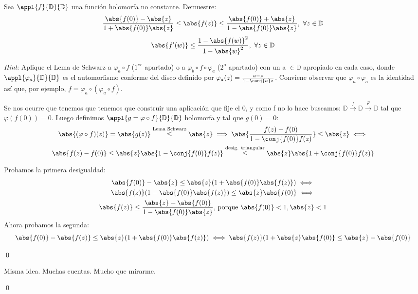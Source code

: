 \begin{problem}[5]
Sea $\appl{f}{\mathbb{D}}{\mathbb{D}}$ una función holomorfa no constante. Demuestre:
\ppart
\[\frac{\abs{f(0)} - \abs{z}}{1 + \abs{f(0)}\abs{z}} \leq \abs{f(z)} \leq \frac{\abs{f(0)} + \abs{z}}{1 - \abs{f(0)}\abs{z}}, \ \forall z \in \mathbb{D}\]
\ppart
\[\abs{f'(w)} \leq \frac{1 - \abs{f(w)}^2}{1 - \abs{w}^2}, \ \forall z \in \mathbb{D}\]

{\it Hint}: Aplique el Lema de Schwarz a $\varphi_a \circ f$ ($1^{er}$ apartado) o a $\varphi_b \circ f \circ \varphi_a$ ($2^o$ apartado) con un a $\in \mathbb{D}$ apropiado en cada caso, donde $\appl{\varphi_a}{\mathbb{D}}{\mathbb{D}}$ es el automorfismo conforme del disco definido por $\varphi_a(z) = \frac{a - z}{1 - \conj{a} z}$. Conviene observar que $\varphi_a \circ \varphi_a$ es la identidad así que, por ejemplo, $f = \varphi_a \circ (\varphi_a \circ f)$.
\solution

\spart
Se nos ocurre que tenemos que tenemos que construir una aplicación que fije el 0, y como f no lo hace buscamos: $\mathbb{D}\xrightarrow{f}\mathbb{D}\xrightarrow{\varphi}\mathbb{D}$ tal que $\varphi(f(0)) = 0$.
Luego definimos $\appl{g = \varphi \circ f}{\mathbb{D}}{\mathbb{D}}$ holomorfa y tal que $g(0) = 0$:
\begin{gather*}
\abs{(\varphi \circ f)(z)} = \abs{g(z)} \stackrel{\text{Lema Schwarz}}{\leq} \abs{z} \implies \abs{\frac{f(z) - f(0)}{1 - \conj{f(0)} f(z)}} \leq \abs{z} \iff \\
\abs{f(z) - f(0)} \leq \abs{z} \abs{1 - \conj{f(0)} f(z)} \stackrel{\text{desig. triangular}}{\leq} \abs{z} \abs{1 + \conj{f(0)} f(z)}
\end{gather*}

Probamos la primera desigualdad:
\begin{gather*}
\abs{f(0)} - \abs{z} \leq \abs{z}(1 + \abs{f(0)}\abs{f(z)}) \iff\\
\abs{f(z)}(1 - \abs{f(0)}\abs{f(z)}) \leq \abs{z} \abs{f(0)} \iff\\
\abs{f(z)} \leq \frac{\abs{z} + \abs{f(0)}}{1 - \abs{f(0)}\abs{z}} \text{, porque } \abs{f(0)} < 1, \abs{z} < 1
\end{gather*}
Ahora probamos la segunda:
\[ \abs{f(0)} - \abs{f(z)} \leq \abs{z}(1 + \abs{f(0)}\abs{f(z)}) \iff \abs{f(z)} (1 + \abs{z}\abs{f(0)} \leq \abs{z} - \abs{f(0)} \]

$ $\hfill\qed

\spart
Misma idea. Muchas cuentas. Mucho que mirarme.

$ $\hfill\qed
\end{problem}

